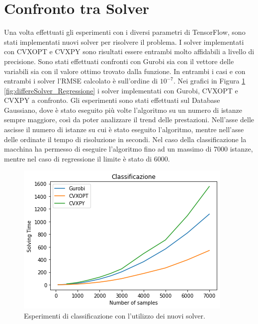 \documentclass[a4paper,12pt]{report}
\begin{document}
\section{Confronto tra Solver}
Una volta effettuati gli esperimenti con i diversi parametri di TensorFlow, sono stati implementati nuovi solver per risolvere il problema. I solver implementati con CVXOPT e CVXPY sono risultati essere entrambi molto affidabili a livello di precisione. Sono stati effettuati confronti con Gurobi sia con il vettore delle variabili sia con il valore ottimo trovato dalla funzione. In entrambi i casi e con entrambi i solver l'RMSE calcolato è sull'ordine di $10^{-7}$. Nei grafici in Figura \ref{fig:differeSolver_Classification} \ref{fig:differeSolver_Regressione} i solver implementati con Gurobi, CVXOPT e CVXPY a confronto. Gli esperimenti sono stati effettuati sul Database Gaussiano, dove è stato eseguito più volte l'algoritmo su un numero di istanze sempre maggiore, così da poter analizzare il trend delle prestazioni. Nell'asse delle ascisse il numero di istanze su cui è stato eseguito l'algoritmo, mentre nell'asse delle ordinate il tempo di risoluzione in secondi. Nel caso della classificazione la macchina ha permesso di eseguire l'algoritmo fino ad un massimo di 7000 istanze, mentre nel caso di regressione il limite è stato di 6000.

\begin{figure}[H]
    \centering
    \includegraphics[scale=0.8]{images/Grafici/DifferentSolver_Classification.png}
    \caption{Esperimenti di classificazione con l'utilizzo dei nuovi solver.}
    \label{fig:differeSolver_Classification}
\end{figure}
\end{document}
